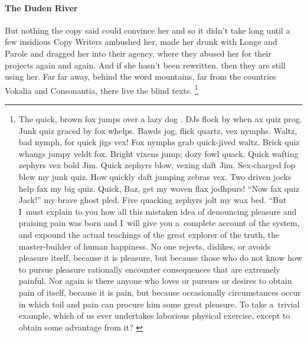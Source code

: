 \documentclass[12pt, a4paper, oneside]{article}
\renewcommand{\caps}[1]{{\textscale{0.97}{\textls[50]{\MakeUppercase{#1}}}}}
\theoremstyle{Plain}
\theoremstyle{Definition}
\theoremstyle{Remark}
\begin{document}
\paragraph{The Duden River}
\label{sec:tests:lorem-ipsum:main:duden}
But nothing the copy said could convince her and so it didn't take long until a few insidious Copy Writers ambushed her, made her drunk with Longe and Parole and dragged her into their agency, where they abused her for their projects again and again. And if she hasn't been rewritten, then they are still using her. Far far away, behind the word mountains, far from the countries Vokalia and Consonantia, there live the blind texts.%
\footnote{The quick, brown fox jumps over a lazy dog \citep{knuth:ct:b, knuth:ct:c}. DJs flock by when \caps{MTV} ax quiz prog. Junk \caps{MTV} quiz graced by fox whelps. Bawds jog, flick quartz, vex nymphs. Waltz, bad nymph, for quick jigs vex! Fox nymphs grab quick-jived waltz. Brick quiz whangs jumpy veldt fox. Bright vixens jump; dozy fowl quack. Quick wafting zephyrs vex bold Jim. Quick zephyrs blow, vexing daft Jim. Sex-charged fop blew my junk \caps{TV} quiz. How quickly daft jumping zebras vex. Two driven jocks help fax my big quiz. Quick, Baz, get my woven flax jodhpurs! ``Now fax quiz Jack!'' my brave ghost pled. Five quacking zephyrs jolt my wax bed. ``But I~must explain to you how all this mistaken idea of denouncing pleasure and praising pain was born and I~will give you a~complete account of the system, and expound the actual teachings of the great explorer of the truth, the master-builder of human happiness. No one rejects, dislikes, or avoids pleasure itself, because it is pleasure, but because those who do not know how to pursue pleasure rationally encounter consequences that are extremely painful. Nor again is there anyone who loves or pursues or desires to obtain pain of itself, because it is pain, but because occasionally circumstances occur in which toil and pain can procure him some great pleasure. To take a~trivial example, which of us ever undertakes laborious physical exercise, except to obtain some advantage from it? %
\citep[210.]{cicero}}
\end{document}
